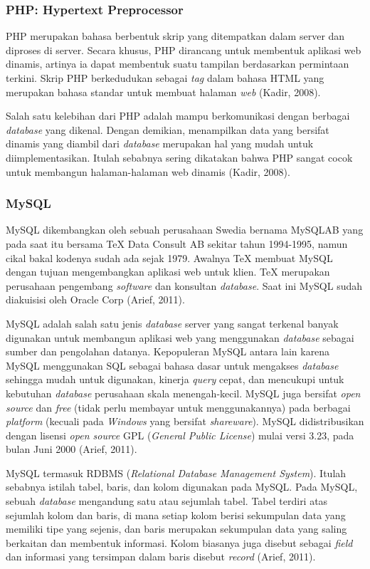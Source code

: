     \subsubsection{PHP: Hypertext Preprocessor}
    PHP merupakan bahasa berbentuk skrip yang ditempatkan dalam server dan diproses di server. Secara khusus, PHP dirancang untuk membentuk aplikasi web dinamis, artinya ia dapat membentuk suatu tampilan berdasarkan permintaan terkini. Skrip PHP berkedudukan sebagai \emph{tag} dalam bahasa HTML yang merupakan bahasa standar untuk membuat halaman \emph{web} (Kadir, 2008).

    Salah satu kelebihan dari PHP adalah mampu berkomunikasi dengan berbagai \emph{database} yang dikenal. Dengan demikian, menampilkan data yang bersifat dinamis yang diambil dari \emph{database} merupakan hal yang mudah untuk diimplementasikan. Itulah sebabnya sering dikatakan bahwa PHP sangat cocok untuk membangun halaman-halaman web dinamis (Kadir, 2008).

    \subsubsection{MySQL}
    MySQL dikembangkan oleh sebuah perusahaan Swedia bernama MySQLAB yang pada saat itu bersama TeX Data Consult AB sekitar tahun 1994-1995, namun cikal bakal kodenya sudah ada sejak 1979. Awalnya TeX membuat MySQL dengan tujuan mengembangkan aplikasi web untuk klien. TeX merupakan perusahaan pengembang \emph{software} dan konsultan \emph{database}. Saat ini MySQL sudah diakuisisi oleh Oracle Corp (Arief, 2011).
    
    MySQL adalah salah satu jenis \emph{database} server yang sangat terkenal banyak digunakan untuk membangun aplikasi web yang menggunakan \emph{database} sebagai sumber dan pengolahan datanya. Kepopuleran MySQL antara lain karena MySQL menggunakan SQL sebagai bahasa dasar untuk mengakses \emph{database} sehingga mudah untuk digunakan, kinerja \emph{query} cepat, dan mencukupi untuk kebutuhan \emph{database} perusahaan skala menengah-kecil. MySQL juga bersifat \emph{open source} dan \emph{free} (tidak perlu membayar untuk menggunakannya) pada berbagai \emph{platform} (kecuali pada \emph{Windows} yang bersifat \emph{shareware}). MySQL didistribusikan dengan lisensi \emph{open source} GPL (\emph{General Public License}) mulai versi 3.23, pada bulan Juni 2000 (Arief, 2011).
    
    MySQL termasuk RDBMS (\emph{Relational Database Management System}). Itulah sebabnya istilah tabel, baris, dan kolom digunakan pada MySQL. Pada MySQL, sebuah \emph{database} mengandung satu atau sejumlah tabel. Tabel terdiri atas sejumlah kolom dan baris, di mana setiap kolom berisi sekumpulan data yang memiliki tipe yang sejenis, dan baris merupakan sekumpulan data yang saling berkaitan dan membentuk informasi. Kolom biasanya juga disebut sebagai \emph{field} dan informasi yang tersimpan dalam baris disebut \emph{record} (Arief, 2011).

